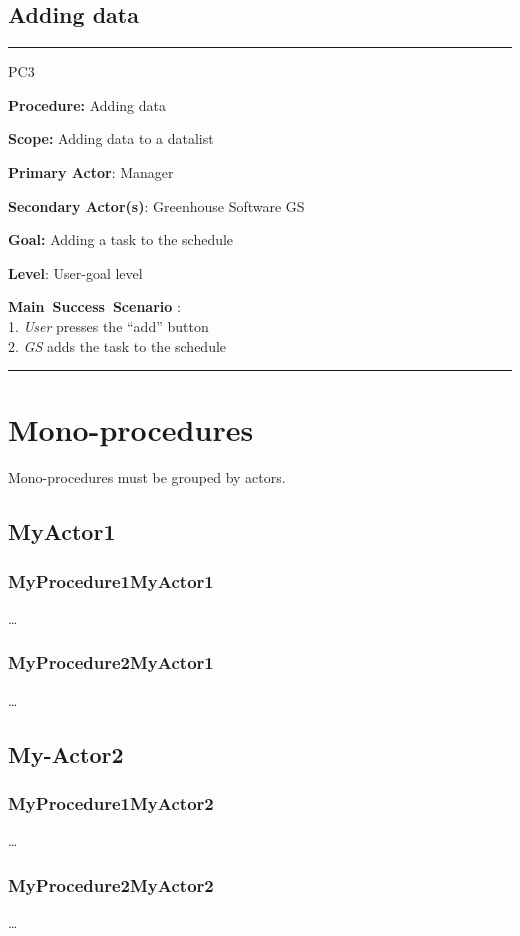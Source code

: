\subsection{Adding data}
\vspace{0.5cm}
\hrule
\begin{lyxlist}{PC3}
\small{
\item [\textbf{Procedure:}] Adding data
\item [\textbf{Scope:}] Adding data to a datalist
\item [\textbf{Primary Actor}:] Manager
\item [\textbf{Secondary Actor(s)}:] Greenhouse Software GS
\item [\textbf{Goal:}] Adding a task to the schedule
\item [\textbf{Level}:] User-goal level
\item [\textbf{Main~Success~Scenario}]:\\
1. \emph{User} presses the “add” button\\
2. \emph{GS} adds the task to the schedule\\
}
\end{lyxlist}
\hrule
\vspace{0.5cm}








\section{Mono-procedures}
Mono-procedures must be grouped by actors.


\subsection{MyActor1}

\subsubsection{MyProcedure1MyActor1}
\ldots

\subsubsection{MyProcedure2MyActor1}
\ldots


\subsection{My-Actor2}

\subsubsection{MyProcedure1MyActor2}
\ldots

\subsubsection{MyProcedure2MyActor2}
\ldots














